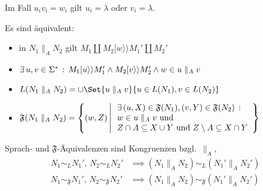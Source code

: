 \documentclass{cheat-sheet}
\newcommand{\labelledTransition}[1]{[{#1}\rangle\rangle} %
\newcommand{\Failure}{\mathfrak{F}} %
\newcommand{\parallelComposition}{\parallel} %
\begin{document}
\begin{bem}
  Im Fall $u_i v_i = w_i$ gilt $u_i = \lambda$ oder $v_i = \lambda$.
\end{bem}

\begin{lem}
  Es sind äquivalent:
  \begin{itemize}
    \item in $N_1 \parallelComposition_A N_2$ gilt $M_1 \amalg M_2 \labelledTransition{w} M_1' \amalg M_2'$
    \item $\ex{u, v \in \Sigma^*} M_1 \labelledTransition{u} M_1' \wedge M_2 \labelledTransition{v} M_2' \wedge w \in u \parallelComposition_A v$
  \end{itemize}
\end{lem}

\begin{satz}
  \begin{itemize}
    \item $L(N_1 \parallelComposition_A N_2) = \cup \Set{u \parallelComposition_A v}{u \in L(N_1), v \in L(N_2)}$
    \item
      $
        \Failure(N_1 \parallelComposition_A N_2) =
        \left\{
        (w, Z)
        \,\middle|\,
        \begin{array}{l}
          \ex{(u, X) \in \Failure(N_1), (v, Y) \in \Failure(N_2)} \\
          w \in u \parallelComposition_A v \text{ und } \\
          Z \cap A \subseteq X \cup Y \text{ und } Z \setminus A \subseteq X \cap Y
        \end{array}
        \right\}
      $
  \end{itemize}
\end{satz}

\begin{kor}
  Sprach- und $\Failure$-Äquivalenzen sind Kongruenzen bzgl.~$\parallelComposition_A$, \dh{}
  \begin{align*}
    N_1 \sim_L N_1', \, N_2 \sim_L N_2' &
    \implies (N_1 \parallelComposition_A N_2) \sim_L (N_1' \parallelComposition_A N_2') \\
    N_1 \sim_\Failure N_1', \, N_2 \sim_\Failure N_2' &
    \implies (N_1 \parallelComposition_A N_2) \sim_\Failure (N_1' \parallelComposition_A N_2')
  \end{align*}
\end{kor}

\end{document}
